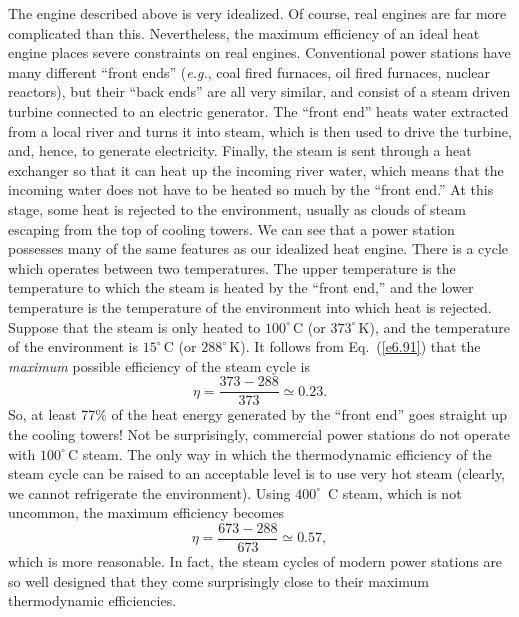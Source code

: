 The engine described above is very idealized. Of course,
real  engines are far
more complicated than this. Nevertheless,  the maximum efficiency of an ideal
heat engine places severe constraints on real  engines.
Conventional power stations  have many different ``front ends''
({\em e.g.}, coal fired furnaces,  oil fired furnaces, nuclear reactors), but their
``back ends'' are all 
very similar, and consist of a steam driven turbine connected to
an electric generator. The ``front end'' heats water extracted
from a local river and turns it into steam, which is then used to
drive the turbine, and, hence, to generate electricity. Finally,
the steam is  sent through
a heat exchanger so that it can  heat up the incoming river water,
which means that the incoming water does not have to be heated so much by 
the ``front end.''\@
At this stage,  some heat is rejected to the environment, usually as clouds
of steam escaping from the top of cooling towers. We can see that a power station
possesses many of the same features as our idealized heat engine. There is a
cycle which operates between two temperatures. The upper temperature is the
temperature to which 
the steam is heated  by the ``front end,'' and the lower temperature
is the temperature of the environment into which heat is rejected. Suppose
that the steam is only heated to $100^\circ$\,C (or $373^\circ$\,K), and the
temperature of the environment is $15^\circ$\,C (or $288^\circ$\,K). It follows from
Eq.~(\ref{e6.91}) that the {\em maximum}\/ possible efficiency of the steam cycle is
\begin{equation}
\eta = \frac{373-288}{373} \simeq 0.23.
\end{equation}
So, at least 77\% of the heat energy generated by the ``front end'' 
goes straight up the cooling towers! Not be surprisingly, commercial
power stations do not operate with $100^\circ$\,C steam. The only
way in which  the thermodynamic efficiency of the steam cycle
can be raised to an acceptable level
 is to use very hot steam (clearly, we  cannot refrigerate the environment).
Using $400^\circ$~C steam, which is not uncommon, the maximum efficiency becomes
\begin{equation}
\eta = \frac{673-288}{673} \simeq 0.57,
\end{equation}
which is more reasonable.
In fact, the steam cycles of modern power stations are so well designed that
they come surprisingly close  to their 
maximum thermodynamic
efficiencies.

